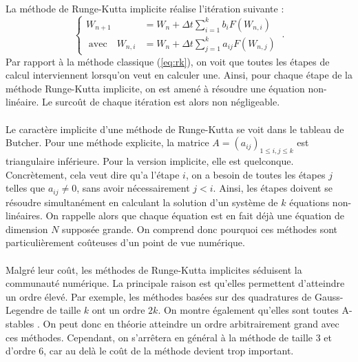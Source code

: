     \paragraph{}
    La méthode de Runge-Kutta implicite réalise l'itération suivante :
    \begin{equation}\label{eq:rk_impl}
      \left\{\begin{aligned}
        W_{n+1} &= W_n + \Delta t\sum_{i = 1}^kb_iF\left(W_{n,i}\right) \\
        \;\textrm{avec}\quad W_{n,i} &= W_n + \Delta t \sum_{j = 1}^ka_{ij}F\left(W_{n,j}\right)
      \end{aligned}\right.\ .
    \end{equation}
    Par rapport à la méthode classique (\ref{eq:rk}), on voit que toutes les étapes de calcul interviennent lorsqu'on veut en calculer une.
    Ainsi, pour chaque étape de la méthode Runge-Kutta implicite, on est amené à résoudre une équation non-linéaire.
    Le surcoût de chaque itération est alors non négligeable.

    \paragraph{}
    Le caractère implicite d'une méthode de Runge-Kutta se voit dans le tableau de Butcher.
    Pour une méthode explicite, la matrice $A = \left(a_{ij}\right)_{1\leq i, j\leq k}$ est triangulaire inférieure.
    Pour la version implicite, elle est quelconque.
    Concrètement, cela veut dire qu'a l'étape $i$, on a besoin de toutes les étapes $j$ telles que $a_{ij}\neq 0$, sans avoir nécessairement $j < i$.
    Ainsi, les étapes doivent se résoudre simultanément en calculant la solution d'un système de $k$ équations non-linéaires.
    On rappelle alors que chaque équation est en fait déjà une équation de dimension $N$ supposée grande.
    On comprend donc pourquoi ces méthodes sont particulièrement coûteuses d'un point de vue numérique.

    \paragraph{}
    Malgré leur coût, les méthodes de Runge-Kutta implicites séduisent la communauté numérique.
    La principale raison est qu'elles permettent d'atteindre un ordre élevé.
    Par exemple, les méthodes basées sur des quadratures de Gauss-Legendre de taille $k$ ont un ordre $2k$.
    On montre également qu'elles sont toutes A-stables \cite{Iserles2008}.
    On peut donc en théorie atteindre un ordre arbitrairement grand avec ces méthodes.
    Cependant, on s’arrêtera en général à la méthode de taille 3 et d'ordre 6, car au delà le coût de la méthode devient trop important.

